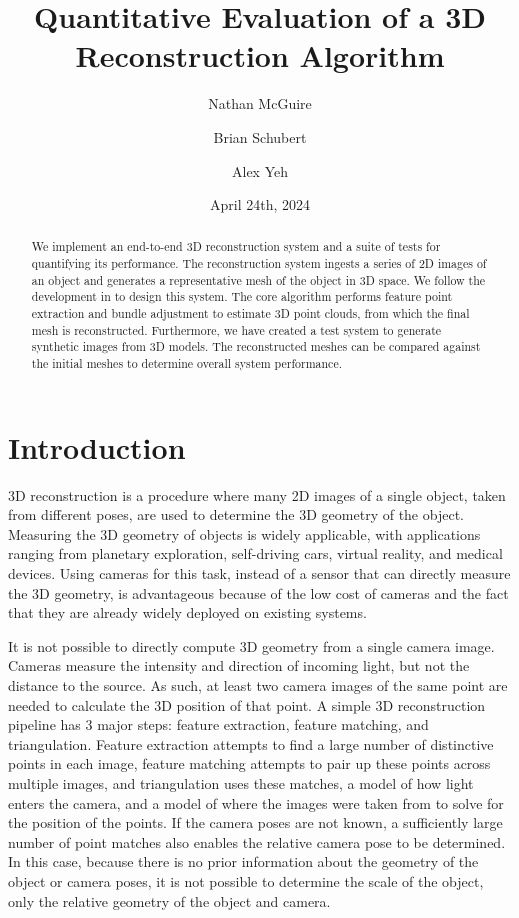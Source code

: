 \documentclass[12pt,letterpaper]{article} %
\title{\bfseries{} Quantitative Evaluation of a 3D Reconstruction Algorithm}
\author{
    Nathan McGuire \\ \FancyEmail{mcguire.n@northeastern.edu} \and
    Brian Schubert \\ \FancyEmail{schubert.b@northeastern.edu}\and
    Alex Yeh \\ \FancyEmail{yeh.al@northeastern.edu}
}
\date{April 24th, 2024}
\begin{document}
\maketitle
\vfill
\begin{abstract}
    We implement an end-to-end 3D reconstruction system and a suite of tests for quantifying its performance. The reconstruction system ingests a series of 2D images of an object and generates a representative mesh of the object in 3D space. We follow the development in \cite{9229407} to design this system. The core algorithm performs feature point extraction and bundle adjustment to estimate 3D point clouds, from which the final mesh is reconstructed.  Furthermore, we have created a test system to generate synthetic images from 3D models.  The reconstructed meshes can be compared against the initial meshes to determine overall system performance.
\end{abstract}
\clearpage
\tableofcontents
\clearpage



\section{Introduction}
3D reconstruction is a procedure where many 2D images of a single object, taken from different poses, are used to determine the 3D geometry of the object.  Measuring the 3D geometry of objects is widely applicable, with applications ranging from planetary exploration, self-driving cars, virtual reality, and medical devices.  Using cameras for this task, instead of a sensor that can directly measure the 3D geometry, is advantageous because of the low cost of cameras and the fact that they are already widely deployed on existing systems.

It is not possible to directly compute 3D geometry from a single camera image.  Cameras measure the intensity and direction of incoming light, but not the distance to the source.  As such, at least two camera images of the same point are needed to calculate the 3D position of that point.  A simple 3D reconstruction pipeline has 3 major steps: feature extraction, feature matching, and triangulation.  Feature extraction attempts to find a large number of distinctive points in each image, feature matching attempts to pair up these points across multiple images, and triangulation uses these matches, a model of how light enters the camera, and a model of where the images were taken from to solve for the position of the points.  If the camera poses are not known, a sufficiently large number of point matches also enables the relative camera pose to be determined.  In this case, because there is no prior information about the geometry of the object or camera poses, it is not possible to determine the scale of the object, only the relative geometry of the object and camera.
\end{document}
